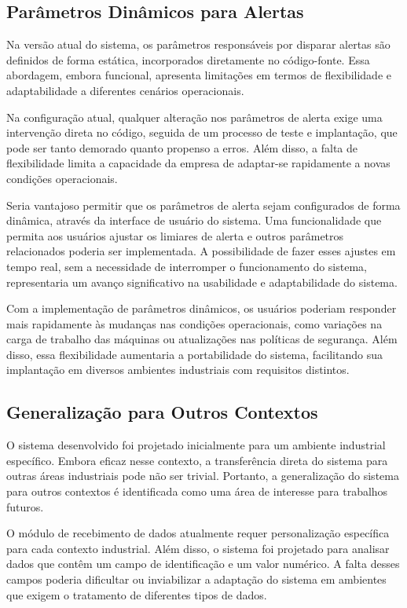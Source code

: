 \subsection{Parâmetros Dinâmicos para Alertas}

Na versão atual do sistema, os parâmetros responsáveis por disparar alertas são definidos de forma estática, incorporados diretamente no código-fonte. Essa abordagem, embora funcional, apresenta limitações em termos de flexibilidade e adaptabilidade a diferentes cenários operacionais.

Na configuração atual, qualquer alteração nos parâmetros de alerta exige uma intervenção direta no código, seguida de um processo de teste e implantação, que pode ser tanto demorado quanto propenso a erros. Além disso, a falta de flexibilidade limita a capacidade da empresa de adaptar-se rapidamente a novas condições operacionais.

Seria vantajoso permitir que os parâmetros de alerta sejam configurados de forma dinâmica, através da interface de usuário do sistema. Uma funcionalidade que permita aos usuários ajustar os limiares de alerta e outros parâmetros relacionados poderia ser implementada. A possibilidade de fazer esses ajustes em tempo real, sem a necessidade de interromper o funcionamento do sistema, representaria um avanço significativo na usabilidade e adaptabilidade do sistema.

Com a implementação de parâmetros dinâmicos, os usuários poderiam responder mais rapidamente às mudanças nas condições operacionais, como variações na carga de trabalho das máquinas ou atualizações nas políticas de segurança. Além disso, essa flexibilidade aumentaria a portabilidade do sistema, facilitando sua implantação em diversos ambientes industriais com requisitos distintos.

\subsection{Generalização para Outros Contextos}

O sistema desenvolvido foi projetado inicialmente para um ambiente industrial específico. Embora eficaz nesse contexto, a transferência direta do sistema para outras áreas industriais pode não ser trivial. Portanto, a generalização do sistema para outros contextos é identificada como uma área de interesse para trabalhos futuros.

O módulo de recebimento de dados atualmente requer personalização específica para cada contexto industrial. Além disso, o sistema foi projetado para analisar dados que contêm um campo de identificação e um valor numérico. A falta desses campos poderia dificultar ou inviabilizar a adaptação do sistema em ambientes que exigem o tratamento de diferentes tipos de dados.

